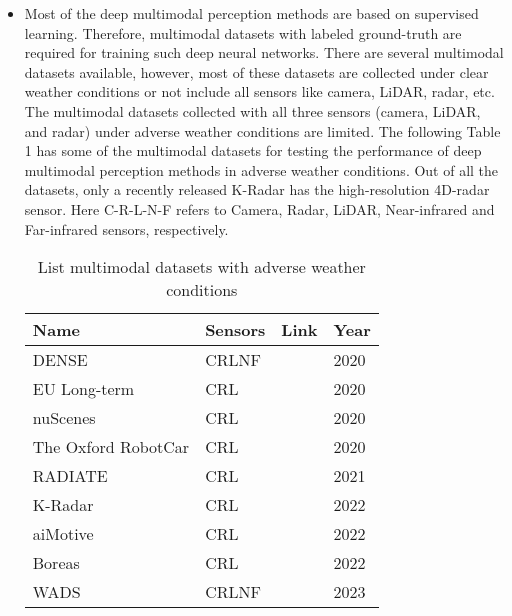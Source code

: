 \documentclass[rnd]{mas_proposal}
\begin{document}
\begin{itemize}
      \item Most of the deep multimodal perception methods are based on supervised learning. Therefore, multimodal datasets with labeled ground-truth are required for training such deep neural networks. There are several multimodal datasets available, however, most of these datasets are collected under clear weather conditions or not include all sensors like camera, LiDAR, radar, etc. The multimodal datasets collected with all three sensors (camera, LiDAR, and radar) under adverse weather conditions are limited. The following Table 1 has some of the multimodal datasets for testing the performance of deep multimodal perception methods in adverse weather conditions. Out of all the datasets, only a recently released K-Radar \cite{Paek2022Jun} has the high-resolution 4D-radar sensor. Here C-R-L-N-F refers to Camera, Radar, LiDAR, Near-infrared and Far-infrared sensors, respectively.
          \begin{table}[h]
              \centering
              \caption{List multimodal datasets with adverse weather conditions}
              \label{tab:my-table}
              \begin{tabular}{|l|l|l|l|}
                  \hline
                  \textbf{Name}       & \textbf{Sensors} & \textbf{Link}               & \textbf{Year} \\ \hline
                  DENSE               & CRLNF            & \cite{bijelic2020seeing}    & 2020          \\ \hline
                  EU Long-term        & CRL              & \cite{yan2020eu}            & 2020          \\ \hline
                  nuScenes            & CRL              & \cite{caesar2020nuscenes}   & 2020          \\ \hline
                  The Oxford RobotCar & CRL              & \cite{barnes2020oxford}     & 2020          \\ \hline
                  RADIATE             & CRL              & \cite{sheeny2021radiate}    & 2021          \\ \hline
                  K-Radar             & CRL              & \cite{Paek2022Jun}          & 2022          \\ \hline
                  aiMotive            & CRL              & \cite{matuszka2022aimotive} & 2022          \\ \hline
                  Boreas              & CRL              & \cite{burnett2022boreas}    & 2022          \\ \hline
                  WADS                & CRLNF            & \cite{kurup2022winter}      & 2023          \\ \hline
              \end{tabular}
          \end{table}


\end{itemize}
\end{document}

